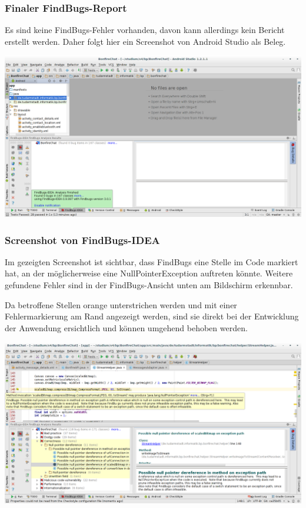 \subsubsection{Finaler FindBugs-Report}

Es sind keine FindBugs-Fehler vorhanden, davon kann allerdings kein Bericht erstellt werden. Daher folgt hier ein Screenshot von Android Studio als Beleg.

\includegraphics[width=17.5cm]{belege/findbugs/findbugs-no-warnings-screenshot.png}


\clearpage
\subsubsection{Screenshot von FindBugs-IDEA}

Im gezeigten Screenshot ist sichtbar, dass FindBugs eine Stelle im Code markiert hat, an der möglicherweise eine NullPointerException auftreten könnte. Weitere gefundene Fehler sind in der FindBugs-Ansicht unten am Bildschirm erkennbar.

Da betroffene Stellen orange unterstrichen werden und mit einer Fehlermarkierung am Rand angezeigt werden, sind sie direkt bei der Entwicklung der Anwendung ersichtlich und können umgehend behoben werden.

\includegraphics[width=17.5cm]{belege/findbugs/findbugs-idea-screenshot.png}

